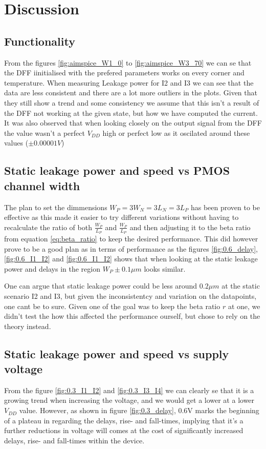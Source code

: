 \section{Discussion}

\subsection{Functionality}
From the figures \ref{fig:aimspice_W1_0} to \ref{fig:aimspice_W3_70} we can se that the DFF iinitialised with the prefered parameters works on every corner and temperature. When measuring Leakage power for I2 and I3 we can see that the data are less consistent and there are a lot more outliers in the plots. Given that they still show a trend and some consistency we assume that this isn't a result of the DFF not working at the given state, but how we have computed the current. It was also observed that when looking closely on the output signal from the DFF the value wasn't a perfect $V_{DD}$ high or perfect low as it oscilated around these values ($\pm0.00001V$) 

\subsection{Static leakage power and speed vs PMOS channel width}
The plan to set the dimmensions $W_P=3W_N=3L_N=3L_P$ has been proven to be effective as this made it easier to try different variations without having to recalculate the ratio of both $\frac{W_P}{L_P}$ and $\frac{W_P}{L_P}$ and then adjusting it to the beta ratio from equation \ref{eq:beta_ratio} to keep the desired performance. This did however prove to be a good plan as in terms of performance as the figures \ref{fig:0.6_delay}, \ref{fig:0.6_I1_I2} and \ref{fig:0.6_I1_I2} shows that when looking at the static leakage power and delays in the region $W_P \pm 0.1\mu m$ looks similar.

 One can argue that static leakage power could be less around $0.2\mu m$ at the static scenario I2 and I3, but given the inconsistentcy and variation on the datapoints, one cant be to sure. Given one of the goal was to keep the beta ratio $r$ at one, we didn't test the how this affected the performance ourself, but chose to rely on the theory instead.

 \subsection{Static leakage power and speed vs supply voltage}
 From the figure \ref{fig:0.3_I1_I2} and \ref{fig:0.3_I3_I4} we can clearly se that it is a growing trend when increasing the voltage, and we would get a lower at a lower $V_{DD}$ value. However, as shown in figure \ref{fig:0.3_delay}, 0.6V marks the beginning of a plateau in regarding the delays, rise- and fall-times, implying that it's a further reductions in voltage will comes at the cost of significantly increased delays, rise- and fall-times within the device.

